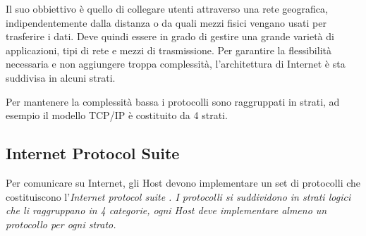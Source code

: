 Il suo obbiettivo è quello di collegare utenti attraverso una rete geografica, indipendentemente dalla distanza o da quali mezzi fisici vengano usati per trasferire i dati. Deve quindi essere in grado di gestire una grande varietà di applicazioni, tipi di rete e mezzi di trasmissione. Per garantire la flessibilità necessaria e non aggiungere troppa complessità, l'architettura di Internet è sta suddivisa in alcuni strati.

Per mantenere la complessità bassa i protocolli sono raggruppati in strati, ad esempio il modello TCP/IP è costituito da 4 strati. 





\subsection{Internet Protocol Suite}

Per comunicare su Internet, gli Host devono implementare un set di protocolli che costituiscono l'\it{Internet protocol suite} \cite{RFC_1122}. I protocolli si suddividono in strati logici che li raggruppano in 4 categorie, ogni Host deve implementare almeno un protocollo per ogni strato.

